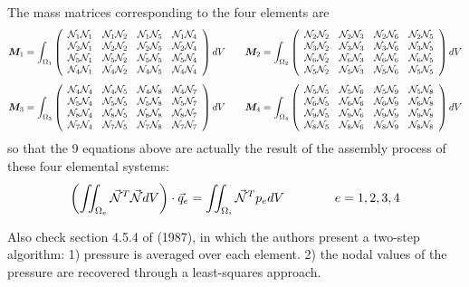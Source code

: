 The mass matrices corresponding to the four elements are 
\[
{\bm M}_1 = \int_{\Omega_1} \left( \begin{array}{cccc}
 \bN_1 \bN_1 & \bN_1 \bN_2 & \bN_1 \bN_5 & \bN_1 \bN_4 \\
 \bN_2 \bN_1 & \bN_2 \bN_2 & \bN_2 \bN_5 & \bN_2 \bN_4 \\
 \bN_5 \bN_1 & \bN_5 \bN_2 & \bN_5 \bN_5 & \bN_5 \bN_4 \\
 \bN_4 \bN_1 & \bN_4 \bN_2 & \bN_4 \bN_5 & \bN_4 \bN_4 
\end{array}\right) dV
\qquad
{\bm M}_2 = \int_{\Omega_2} \left( \begin{array}{cccc}
 \bN_2 \bN_2 & \bN_2 \bN_3 & \bN_2 \bN_6 & \bN_2 \bN_5 \\
 \bN_3 \bN_2 & \bN_3 \bN_3 & \bN_3 \bN_6 & \bN_3 \bN_5 \\
 \bN_6 \bN_2 & \bN_6 \bN_3 & \bN_6 \bN_6 & \bN_6 \bN_5 \\
 \bN_5 \bN_2 & \bN_5 \bN_3 & \bN_5 \bN_6 & \bN_5 \bN_5 
\end{array}\right) dV
\]
\[
{\bm M}_3 = \int_{\Omega_3} \left( \begin{array}{cccc}
 \bN_4 \bN_4 & \bN_4 \bN_5 & \bN_4 \bN_8 & \bN_4 \bN_7 \\
 \bN_5 \bN_4 & \bN_5 \bN_5 & \bN_5 \bN_8 & \bN_5 \bN_7 \\
 \bN_8 \bN_4 & \bN_8 \bN_5 & \bN_8 \bN_8 & \bN_8 \bN_7 \\
 \bN_7 \bN_4 & \bN_7 \bN_5 & \bN_7 \bN_8 & \bN_7 \bN_7 
\end{array}\right) dV
\qquad
{\bm M}_4 = \int_{\Omega_4} \left( \begin{array}{cccc}
 \bN_5 \bN_5 & \bN_5 \bN_6 & \bN_5 \bN_9 & \bN_5 \bN_8 \\
 \bN_6 \bN_5 & \bN_6 \bN_6 & \bN_6 \bN_9 & \bN_6 \bN_8 \\
 \bN_9 \bN_5 & \bN_9 \bN_6 & \bN_9 \bN_9 & \bN_9 \bN_8 \\
 \bN_8 \bN_5 & \bN_8 \bN_6 & \bN_8 \bN_9 & \bN_8 \bN_8 
\end{array}\right) dV
\]
so that the 9 equations above are actually the result of the assembly process of these four 
elemental systems:
\[
\left( \iint_{\Omega_e} \vec{\bN}^T\vec{\bN} dV \right) \cdot \vec{q}_e = \iint_{\Omega_i} \vec{\bN}^T p_e dV 
\qquad\qquad e=1,2,3,4
\]

Also check section 4.5.4 of \textcite{glte87} (1987), in which the authors 
present a two-step algorithm: 1) pressure is averaged over each element.
2) the nodal values of the pressure are recovered through a least-squares approach.


